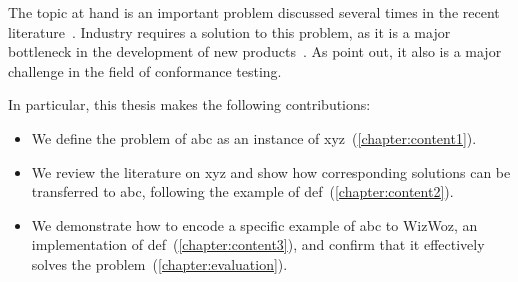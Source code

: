 The topic at hand is an important problem discussed several times in the recent literature~\cite{oakland23-xfl,spmag23-mlmalware,cryptosec11}.
Industry requires a solution to this problem, as it is a major bottleneck in the development of new products~\cite{phdthesis-kinder}.
As \citet{conformance-testing-arxiv} point out, it also is a major challenge in the field of conformance testing.

\lipsum[2-4]

In particular, this thesis makes the following contributions:
\begin{itemize}
    \item We define the problem of abc as an instance of xyz~(\autoref{chapter:content1}).
    \item We review the literature on xyz and show how corresponding solutions can be transferred to abc, following the example of def~(\autoref{chapter:content2}).
    \item We demonstrate how to encode a specific example of abc to WizWoz, an implementation of def~(\autoref{chapter:content3}), and confirm that it effectively solves the problem~(\autoref{chapter:evaluation}).
\end{itemize}
